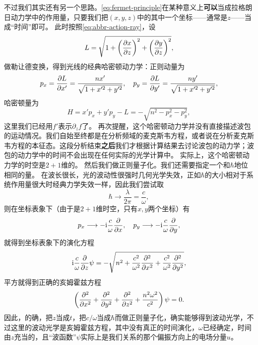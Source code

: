 \documentclass[UTF8, a4paper]{ctexart}
\newcommand*{\ii}{\mathrm{i}}
\renewcommand{\emph}{\textbf}
\begin{document}
不过我们其实还有另一个思路。\eqref{eq:fermet-principle}在某种意义上\emph{可以}当成拉格朗日动力学中的作用量，只要我们把$(x, y, z)$中的其中一个坐标——通常是$z$——当成“时间”即可。
此时按照\eqref{eq:abbr-action-ray}，设
\begin{equation}
    L = \sqrt{1 + \left(\pdv{x}{z}\right)^2 + \left(\pdv{y}{z}\right)^2},
\end{equation}
做勒让德变换，得到光线的经典哈密顿动力学：正则动量为
\begin{equation}
    p_x = \pdv{L}{x'} = \frac{n x'}{\sqrt{1 + x'^2 + y'^2}}, \quad p_y = \pdv{L}{y'} = \frac{n y'}{\sqrt{1 + x'^2 + y'^2}},
\end{equation}
哈密顿量为
\begin{equation}
    H = x' p_x + y' p_y - L = - \sqrt{n^2 - p_x^2 - p_y^2} ,
\end{equation}
这里我们已经用$f'$表示$\partial_z f$了。
再次提醒，这个哈密顿动力学并没有直接描述波包的运动情况。我们自始至终都是在分析频域的麦克斯韦方程，或者说在分析麦克斯韦方程的本征态。这段分析结束\emph{之后}我们才根据计算结果去讨论波包的动力学；波包的动力学中的时间不会出现在任何实际的光学计算中。
实际上，这个哈密顿动力学的时空是$2+1$维的。
然后我们做正则量子化。我们还需要指定一个和$\hbar$地位相同的量。
在波长很长，光的波动性很强时几何光学失效，正如$\hbar$的大小相对于系统作用量很大时经典力学失效一样，因此我们尝试取
\begin{equation}
    \hbar \longrightarrow \frac{\lambda}{2 \pi} = \frac{c}{\omega},
\end{equation}
则在坐标表象下（由于是$2+1$维时空，只有$x, y$两个坐标）有
\begin{equation}
    p_x \longrightarrow - \ii \frac{c}{\omega} \pdv{x}, \quad p_y \longrightarrow - \ii \frac{c}{\omega} \pdv{y},
\end{equation}
就得到坐标表象下的演化方程
\[
    \ii \frac{c}{\omega} \pdv{z} \psi = - \sqrt{n^2 + \frac{c^2}{\omega^2} \pdv[2]{x} + \frac{c^2}{\omega^2} \pdv[2]{y}},
\]
平方就得到正确的亥姆霍兹方程
\[
    \left( \pdv[2]{x} + \pdv[2]{y} + \pdv[2]{z} + \frac{n^2 \omega^2}{c^2} \right) \psi = 0.
\]
因此，的确，把$z$当成$t$，把$c/\omega$当成$\hbar$而做正则量子化，确实能够得到波动光学，不过这里的波动光学是亥姆霍兹方程，其中没有真正的时间演化，$\omega$已经确定，时间由$z$充当的，且“波函数”$\psi$实际上是我们关系的那个偏振方向上的电场分量$u$。
\end{document}
